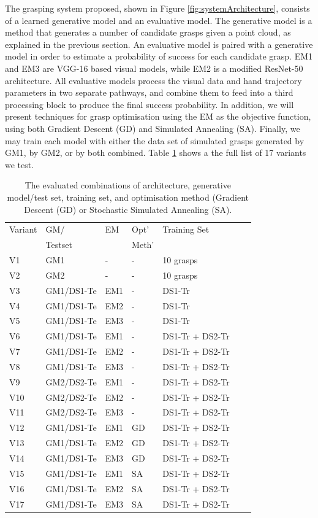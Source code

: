 The grasping system proposed, shown in Figure \ref{fig:systemArchitecture}, consists of a learned generative model and an evaluative model. The generative model is a method that generates a number of candidate grasps given a point cloud, as explained in the previous section. An evaluative model is paired with a generative model in order to estimate a probability of success for each candidate grasp. EM1 and EM3 are VGG-16 based visual models, while EM2 is a modified ResNet-50 architecture. All evaluative models process the visual data and hand trajectory parameters in two separate pathways, and combine them to feed into a third processing block to produce the final success probability. In addition, we will present techniques for grasp optimisation using the EM as the objective function, using both Gradient Descent (GD) and Simulated Annealing (SA). Finally, we may train each model with either the data set of simulated grasps generated by GM1, by GM2, or by both combined. Table \ref{table:GEBreakdown} shows a the full list of 17 variants we test.

\begin{table}[]
\centering
\begin{tabular}{|l|l|l|l|l|l|l|}
\hline
Variant & GM/  & EM & Opt'  & Training Set \\ 
 & Testset & & Meth' & \\ \hline
V1 & GM1    & - & - & 10 grasps  \\ \hline
V2 & GM2    & - & - & 10 grasps  \\ \hline
V3 & GM1/DS1-Te & EM1 & - & DS1-Tr \\ \hline
V4 & GM1/DS1-Te & EM2 & - & DS1-Tr \\ \hline
V5 & GM1/DS1-Te & EM3 & - & DS1-Tr  \\ \hline
V6 & GM1/DS1-Te & EM1 & - & DS1-Tr + DS2-Tr \\ \hline
V7 & GM1/DS1-Te & EM2 & - & DS1-Tr + DS2-Tr \\ \hline
V8 & GM1/DS1-Te & EM3 & - & DS1-Tr + DS2-Tr \\ \hline
V9 & GM2/DS2-Te & EM1 & - & DS1-Tr + DS2-Tr \\ \hline
V10 & GM2/DS2-Te & EM2 & - & DS1-Tr + DS2-Tr \\ \hline
V11 & GM2/DS2-Te & EM3 & - & DS1-Tr + DS2-Tr \\ \hline
V12 & GM1/DS1-Te & EM1 & GD & DS1-Tr + DS2-Tr \\ \hline
V13 & GM1/DS1-Te & EM2 & GD & DS1-Tr + DS2-Tr \\ \hline
V14 & GM1/DS1-Te & EM3 & GD & DS1-Tr + DS2-Tr \\ \hline
V15 & GM1/DS1-Te & EM1 & SA & DS1-Tr + DS2-Tr \\ \hline
V16 & GM1/DS1-Te & EM2 & SA & DS1-Tr + DS2-Tr \\ \hline
V17 & GM1/DS1-Te & EM3 & SA & DS1-Tr + DS2-Tr \\ \hline
\end{tabular}
\caption{The evaluated combinations of architecture, generative model/test set, training set, and optimisation method (Gradient Descent (GD) or Stochastic Simulated Annealing (SA).}
\label{table:GEBreakdown}
\end{table}

